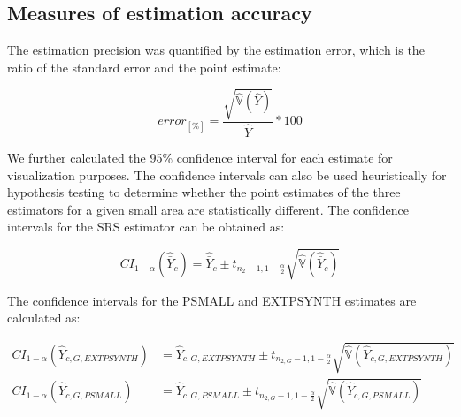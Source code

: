 \documentclass[remotesensing,article,submit,moreauthors,pdftex,10pt,a4paper]{mdpi}
\newcommand{\psmall}{PSMALL}
\newcommand{\extpsynth}{EXTPSYNTH}
\newcommand{\var}{\mathbb{V}}
\begin{document}
\subsection{Measures of estimation accuracy}

The estimation precision was quantified by the estimation error, which is the ratio of the standard error and the point estimate:

\begin{equation}\label{eq:error}
error_{[\%]}=\frac{\sqrt{\hat{\var}(\hat{Y})}}{\hat{Y}}*100
\end{equation}

We further calculated the 95\% confidence interval for each estimate for visualization purposes. The confidence intervals can also be used heuristically for hypothesis testing to determine whether the point estimates of the three estimators for a given small area are statistically different. The confidence intervals for the SRS estimator can be obtained as:


\begin{equation}\label{ci_1phase}
CI_{1-\alpha}(\hat{\bar{Y}}_c)=\hat{\bar{Y}}_c \pm t_{n_{2}-1, 1-\frac{\alpha}{2}}\sqrt{\hat{\var}(\hat{\bar{Y}}_c)}
\end{equation}


The confidence intervals for the \psmall{} and \extpsynth{} estimates are calculated as:


\begin{subequations}\label{ci_2phase_sae}
	\begin{align}
	CI_{1-\alpha}(\hat{Y}_{c,G,EXTPSYNTH})&=\hat{Y}_{c,G,EXTPSYNTH} \pm t_{n_{2,G}-1, 1-\frac{\alpha}{2}}\sqrt{\hat{\var}(\hat{Y}_{c,G,EXTPSYNTH})} \\
	CI_{1-\alpha}(\hat{Y}_{c,G,PSMALL})&=\hat{Y}_{c,G,PSMALL} \pm t_{n_{2,G}-1, 1-\frac{\alpha}{2}}\sqrt{\hat{\var}(\hat{Y}_{c,G,PSMALL})}
	\end{align}
\end{subequations}
\end{document}
